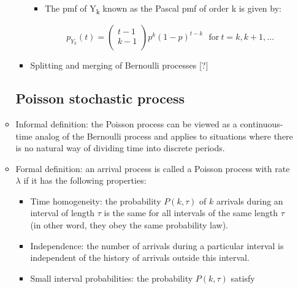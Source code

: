 \documentclass[12pt]{report}
\renewcommand{\_}{\kern-1.5pt\textunderscore\kern-1.5pt}
\begin{document}
\begin{itemize}
\begin{itemize}
\begin{itemize}
\begin{itemize}
	\item The pmf of Y\textsubscript{k} known as the Pascal pmf of order k is given by:\par

 \[ p_{Y_{k}} \left( t \right) = \left( \begin{matrix}
t-1\\
k-1\\
\end{matrix}
 \right) p^{k} \left( 1-p \right) ^{t-k}~~~\mathrm{for~}t=k, k+1, \ldots  \] \par


\end{itemize}
	\item Splitting and merging of Bernoulli processes [?]\par


\end{itemize}\subsection*{Poisson stochastic process}
	\item Informal definition: the Poisson process can be viewed as a continuous-time analog of the Bernoulli process and applies to situations where there is no natural way of dividing time into discrete periods.\par

	\item Formal definition: an arrival process is called a Poisson process with rate  \(  \lambda  \)  if it has the following properties:\par

\begin{itemize}
	\item Time homogeneity: the probability  \( P \left( k, \tau \right)  \)  of  \( k \)  arrivals during an interval of length  \(  \tau \)  is the same for all intervals of the same length  \(  \tau \)  (in other word, they obey the same probability law).\par

	\item Independence: the number of arrivals during a particular interval is independent of the history of arrivals outside this interval.\par

	\item Small interval probabilities: the probability  \( P \left( k, \tau \right)  \)  satisfy\par


\end{itemize}
\end{itemize}
\end{itemize}
\end{document}
